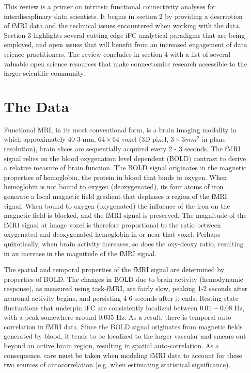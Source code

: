 This review is a primer on intrinsic functional connectivity analyses for interdisciplinary data scientists. It begins in section 2 by providing a description of fMRI data and the technical issues encountered when working with the data. Section 3 highlights several cutting edge iFC analytical paradigms that are being employed, and open issues that will benefit from an increased engagement of data science practitioners. The review concludes in section 4 with a list of several valuable open science resources that make connectomics research accessible to the larger scientific community.

\section{The Data}

Functional MRI, in its most conventional form, is a brain imaging modality in which approximately 40 3-mm, $64 \times 64$ voxel (3D pixel, $3\times3 mm^2$ in-plane resolution), brain slices are sequentially acquired every 2 - 3 seconds. The fMRI signal relies on the blood oxygenation level dependent (BOLD) contrast to derive a relative measure of brain function. The BOLD signal originates in the magnetic properties of hemoglobin, the protein in blood that binds to oxygen. When hemoglobin is not bound to oxygen (deoxygenated), its four atoms of iron generate a local magnetic field gradient that dephases a region of the fMRI signal. When bound to oxygen (oxygenated) the influence of the iron on the magnetic field is blocked, and the fMRI signal is preserved. The magnitude of the fMRI signal at image voxel is therefore proportional to the ratio between oxygenated and deoxygenated hemoglobin in or near that voxel. Perhaps quixotically, when brain activity increases, so does the oxy-deoxy ratio, resulting in an increase in the magnitude of the fMRI signal. 

The spatial and temporal properties of the fMRI signal are determined by properties of BOLD. The changes in BOLD due to brain activity (hemodynamic response), as measured using task-fMRI, are fairly slow, peaking 1-2 seconds after neuronal activity begins, and persisting 4-6 seconds after it ends. Resting state fluctuations that underpin iFC are consistently localized between $0.01-0.08$ Hz, with a peak somewhere around $0.035$ Hz. As a result, there is temporal auto-correlation in fMRI data. Since the BOLD signal originates from magnetic fields generated by blood, it tends to be localized to the larger vascular and smears out beyond an active brain region, resulting in spatial auto-correlation. As a consequence, care must be taken when modeling fMRI data to account for these two sources of autocorrelation (e.g. when estimating statistical significance).

